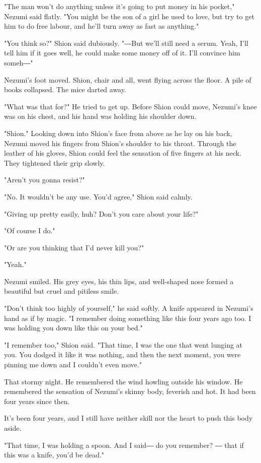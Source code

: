 "The man won't do anything unless it's going to put money in his
pocket," Nezumi said flatly. "You might be the son of a girl he used to
love, but try to get him to do free labour, and he'll turn away as fast
as anything."

"You think so?" Shion said dubiously. "―But we'll still need a serum.
Yeah, I'll tell him if it goes well, he could make some money off of it.
I'll convince him someh―"

Nezumi's foot moved. Shion, chair and all, went flying across the floor.
A pile of books collapsed. The mice darted away.

"What was that for?" He tried to get up. Before Shion could move,
Nezumi's knee was on his chest, and his hand was holding his shoulder
down.

"Shion." Looking down into Shion's face from above as he lay on his
back, Nezumi moved his fingers from Shion's shoulder to his throat.
Through the leather of his gloves, Shion could feel the sensation of
five fingers at his neck. They tightened their grip slowly.

"Aren't you gonna resist?"

"No. It wouldn't be any use. You'd agree," Shion said calmly.

"Giving up pretty easily, huh? Don't you care about your life?"

"Of course I do."

"Or are you thinking that I'd never kill you?"

"Yeah."

Nezumi smiled. His grey eyes, his thin lips, and well-shaped nose formed
a beautiful but cruel and pitiless smile.

"Don't think too highly of yourself," he said softly. A knife appeared
in Nezumi's hand as if by magic. "I remember doing something like this
four years ago too. I was holding you down like this on your bed."

"I remember too," Shion said. "That time, I was the one that went
lunging at you. You dodged it like it was nothing, and then the next
moment, you were pinning me down and I couldn't even move."

That stormy night. He remembered the wind howling outside his window. He
remembered the sensation of Nezumi's skinny body, feverish and hot. It
had been four years since then.

It's been four years, and I still have neither skill nor the heart to
push this body aside.

"That time, I was holding a spoon. And I said― do you remember? ― that
if this was a knife, you'd be dead."

